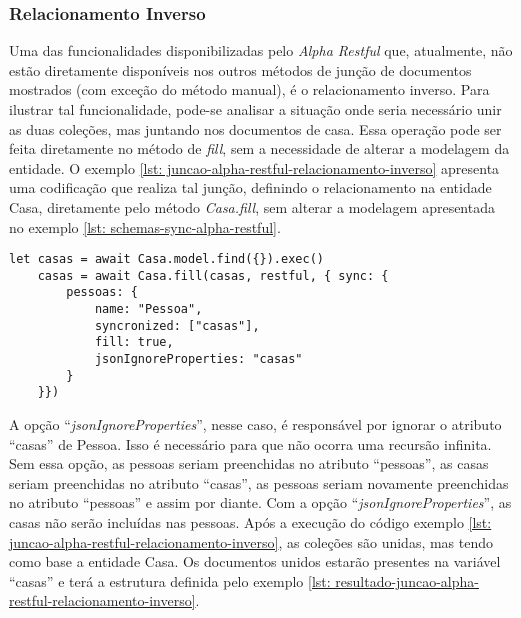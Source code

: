 \subsubsection{Relacionamento Inverso\label{subsubsection: relacionamento-inverso}}

Uma das funcionalidades disponibilizadas pelo \textit{Alpha Restful} que, atualmente, não estão diretamente disponíveis nos outros métodos de junção de documentos mostrados (com exceção do método manual), é o relacionamento inverso. Para ilustrar tal funcionalidade, pode-se analisar a situação onde seria necessário unir as duas coleções, mas juntando nos documentos de casa. Essa operação pode ser feita diretamente no método de \textit{fill}, sem a necessidade de alterar a modelagem da entidade. O exemplo \ref{lst: juncao-alpha-restful-relacionamento-inverso} apresenta uma codificação que realiza tal junção, definindo o relacionamento na entidade Casa, diretamente pelo método \textit{Casa.fill}, sem alterar a modelagem apresentada no exemplo \ref{lst: schemas-sync-alpha-restful}.

\newpage

\begin{lstlisting}[style=ES6, caption={Junção de Documentos em Relacionamento Inverso\label{lst: juncao-alpha-restful-relacionamento-inverso}}]
    let casas = await Casa.model.find({}).exec()
    casas = await Casa.fill(casas, restful, { sync: {
        pessoas: {
            name: "Pessoa",
            syncronized: ["casas"],
            fill: true,
            jsonIgnoreProperties: "casas"
        }
    }})
\end{lstlisting}

A opção ``\textit{jsonIgnoreProperties}'', nesse caso, é responsável por ignorar o atributo ``casas'' de Pessoa. Isso é necessário para que não ocorra uma recursão infinita. Sem essa opção, as pessoas seriam preenchidas no atributo ``pessoas'', as casas seriam preenchidas no atributo ``casas'', as pessoas seriam novamente preenchidas no atributo ``pessoas'' e assim por diante. Com a opção ``\textit{jsonIgnoreProperties}'', as casas não serão incluídas nas pessoas. Após a execução do código exemplo \ref{lst: juncao-alpha-restful-relacionamento-inverso}, as coleções são unidas, mas tendo como base a entidade Casa. Os documentos unidos estarão presentes na variável ``casas'' e terá a estrutura definida pelo exemplo \ref{lst: resultado-juncao-alpha-restful-relacionamento-inverso}.


